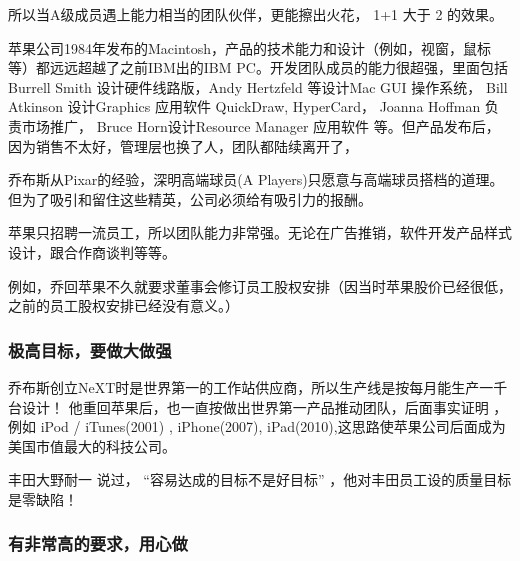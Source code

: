 所以当A级成员遇上能力相当的团队伙伴，更能擦出火花， 1+1 大于 2 的效果。

苹果公司1984年发布的Macintosh，产品的技术能力和设计（例如，视窗，鼠标等）都远远超越了之前IBM出的IBM
PC。开发团队成员的能力很超强，里面包括 Burrell Smith
设计硬件线路版，Andy Hertzfeld 等设计Mac GUI 操作系统， Bill Atkinson
设计Graphics 应用软件 QuickDraw, HyperCard， Joanna Hoffman
负责市场推广， Bruce Horn设计Resource Manager 应用软件
等。但产品发布后，因为销售不太好，管理层也换了人，团队都陆续离开了，

乔布斯从Pixar的经验，深明高端球员(A
Players)只愿意与高端球员搭档的道理。但为了吸引和留住这些精英，公司必须给有吸引力的报酬。

苹果只招聘一流员工，所以团队能力非常强。无论在广告推销，软件开发产品样式设计，跟合作商谈判等等。

例如，乔回苹果不久就要求董事会修订员工股权安排（因当时苹果股价已经很低，之前的员工股权安排已经没有意义。）

\hypertarget{ux6781ux9ad8ux76eeux6807ux8981ux505aux5927ux505aux5f3a}{%
\subsubsection{极高目标，要做大做强}\label{ux6781ux9ad8ux76eeux6807ux8981ux505aux5927ux505aux5f3a}}


乔布斯创立NeXT时是世界第一的工作站供应商，所以生产线是按每月能生产一千台设计！
他重回苹果后，也一直按做出世界第一产品推动团队，后面事实证明 ，例如 iPod
/ iTunes(2001) , iPhone(2007),
iPad(2010),这思路使苹果公司后面成为美国市值最大的科技公司。

丰田大野耐一 说过， ``容易达成的目标不是好目标''
，他对丰田员工设的质量目标是零缺陷！

\hypertarget{ux6709ux975eux5e38ux9ad8ux7684ux8981ux6c42ux7528ux5fc3ux505a}{%
\subsubsection{有非常高的要求，用心做}\label{ux6709ux975eux5e38ux9ad8ux7684ux8981ux6c42ux7528ux5fc3ux505a}}

